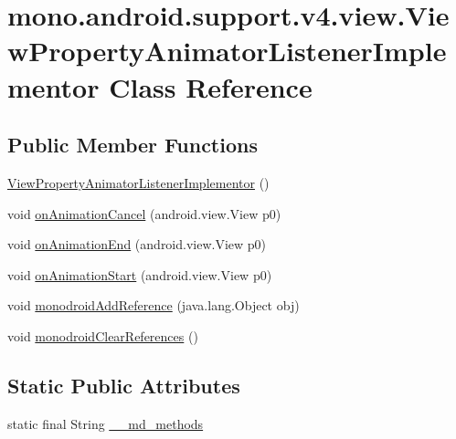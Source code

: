 \hypertarget{classmono_1_1android_1_1support_1_1v4_1_1view_1_1_view_property_animator_listener_implementor}{
\section{mono.android.support.v4.view.ViewPropertyAnimatorListenerImplementor Class Reference}
\label{classmono_1_1android_1_1support_1_1v4_1_1view_1_1_view_property_animator_listener_implementor}
}
\subsection*{Public Member Functions}
\begin{CompactItemize}
\item 
\hyperlink{classmono_1_1android_1_1support_1_1v4_1_1view_1_1_view_property_animator_listener_implementor_f297892d9aaa2f3b16f22a3257c5f1df}{ViewPropertyAnimatorListenerImplementor} ()
\item 
void \hyperlink{classmono_1_1android_1_1support_1_1v4_1_1view_1_1_view_property_animator_listener_implementor_02bf20da31e0f81ebb3620fb9ff53859}{onAnimationCancel} (android.view.View p0)
\item 
void \hyperlink{classmono_1_1android_1_1support_1_1v4_1_1view_1_1_view_property_animator_listener_implementor_1d667373e9a8fc045c1d534c2dd0e794}{onAnimationEnd} (android.view.View p0)
\item 
void \hyperlink{classmono_1_1android_1_1support_1_1v4_1_1view_1_1_view_property_animator_listener_implementor_2b36e1119b339c78bd7e45838d270d96}{onAnimationStart} (android.view.View p0)
\item 
void \hyperlink{classmono_1_1android_1_1support_1_1v4_1_1view_1_1_view_property_animator_listener_implementor_5348ae6f507332f6bec7d1ffd2e03e39}{monodroidAddReference} (java.lang.Object obj)
\item 
void \hyperlink{classmono_1_1android_1_1support_1_1v4_1_1view_1_1_view_property_animator_listener_implementor_113554921abc116cf26103f4789a6efb}{monodroidClearReferences} ()
\end{CompactItemize}
\subsection*{Static Public Attributes}
\begin{CompactItemize}
\item 
static final String \hyperlink{classmono_1_1android_1_1support_1_1v4_1_1view_1_1_view_property_animator_listener_implementor_b6738444d210e9579be376595ecb6c38}{\_\-\_\-md\_\-methods}
\end{CompactItemize}
